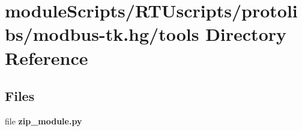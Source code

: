 \section{module\+Scripts/\+R\+T\+Uscripts/protolibs/modbus-\/tk.hg/tools Directory Reference}
\label{dir_6d977f2cc2fc51a6bfaed534994f2245}
\subsection*{Files}
\begin{DoxyCompactItemize}
\item 
file {\bf zip\+\_\+module.\+py}
\end{DoxyCompactItemize}
